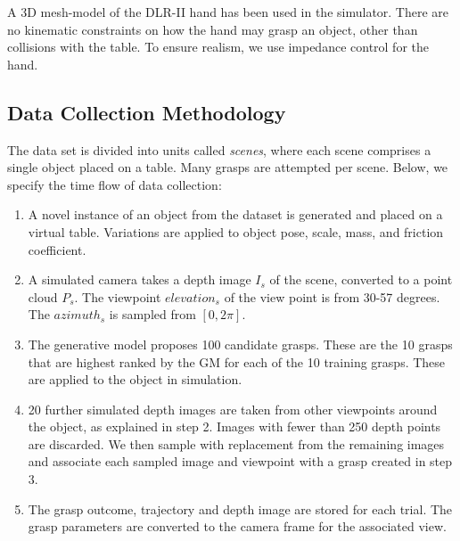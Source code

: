 A 3D mesh-model of the DLR-II hand has been used in the simulator. There are no kinematic constraints on how the hand may grasp an object, other than collisions with the table. To ensure realism, we use impedance control for the hand.

\subsection{Data Collection Methodology}
\label{subsection:dataCollection}

The data set is divided into units called \textit{scenes}, where each scene comprises a single object placed on a table. Many grasps are attempted per scene. Below, we specify the time flow of data collection:

\begin{enumerate}
\item A novel instance of an object from the dataset is generated and placed on a virtual table. Variations are applied to object pose, scale, mass, and friction coefficient.
\item A simulated camera takes a depth image $I_s$ of the scene, converted to a point cloud $P_s$. The viewpoint ${elevation}_s$ of the view point is from 30-57 degrees. The ${azimuth}_s$ is sampled from $[0, 2\pi]$. 
\item The generative model proposes 100 candidate grasps. These are the 10 grasps that are highest ranked by the GM for each of the 10 training grasps. These are applied to the object in simulation.
\item 20 further simulated depth images are taken from other viewpoints around the object, as explained in step 2. Images with fewer than 250 depth points are discarded. We then sample with replacement from the remaining images and associate each sampled image and viewpoint with a grasp created in step 3.
\item The grasp outcome, trajectory and depth image are stored for each trial. The grasp parameters are converted to the camera frame for the associated view.
\end{enumerate}


